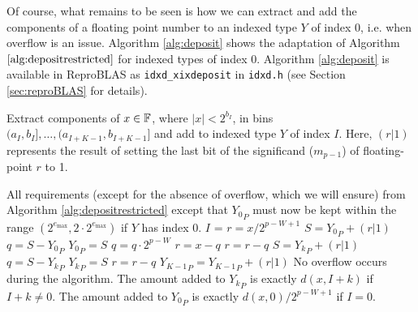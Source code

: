      Of course, what remains to be seen is how we can extract and add the
      components of a floating point number to an indexed type $Y$ of index 0,
      i.e. when overflow is an issue. Algorithm \ref{alg:deposit} shows the
      adaptation of Algorithm $\ref{alg:depositrestricted}$ for indexed types
      of index 0. Algorithm \ref{alg:deposit} is available in ReproBLAS as \texttt{idxd\_xixdeposit} in \texttt{idxd.h} (see Section \ref{sec:reproBLAS} for details).

      \begin{samepage}
      \begin{alg}
        Extract components of $x \in \mathbb{F}$, where $|x| < 2^{b_I}$,
        in bins $(a_I,b_I], \ldots, (a_{I + K - 1}, b_{I + K - 1}]$
        and add to indexed type $Y$ of index $I$. Here, $(r | 1)$ represents
        the result of setting the last bit of the significand ($m_{p - 1}$) of
        floating-point $r$ to 1.
        \begin{algorithmic}[1]
          \Require
            \Statex All requirements (except for the absence of overflow, which we will ensure)
            from Algorithm \ref{alg:depositrestricted} except that ${Y_0}_P$
            must now be kept within the range $(2^{e_{\max}}, 2 \cdot 2^{e_{\max}})$ if $Y$ has index 0.
            \State $I$ = 
              \State $r = x / 2^{p - W + 1}$ \label{alg:deposit:scaler}
              \State $S = {Y_0}_P + (r | 1)$ \label{alg:deposit:formS}
              \State $q = S - {Y_0}_P$ \label{alg:deposit:formq}
              \State ${Y_0}_P = S$
              \State $q = q \cdot 2^{p - W}$ \label{alg:deposit:scaleq}
              \State $r = x - q$ \label{alg:deposit:formr}
              \State $r = r - q$ \label{alg:deposit:formragain}
                \State $S = {Y_k}_P + (r | 1)$
                \State $q = S - {Y_k}_P$
                \State ${Y_k}_P = S$
                \State $r = r - q$
              \EndFor
              \State ${Y_{K - 1}}_P = {Y_{K - 1}}_P + (r | 1)$
            \Else
              \State{} \label{alg:deposit:callrestricted}
            \EndIf
          \EndFunction
          \Ensure
            \Statex No overflow occurs during the algorithm.
            \Statex The amount added to ${Y_k}_P$ is exactly $d(x, I + k)$ if $I + k \neq 0$.
            \Statex The amount added to ${Y_0}_P$ is exactly $d(x, 0)/2^{p - W + 1}$ if $I = 0$.
        \end{algorithmic}
        \label{alg:deposit}
      \end{alg}
      \end{samepage}

